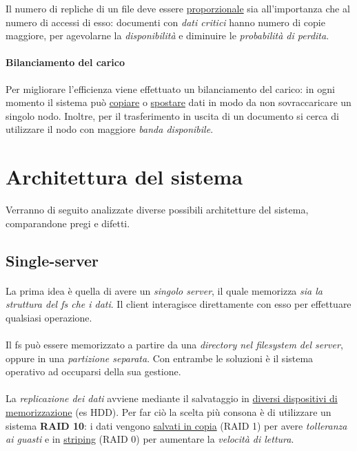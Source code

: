 \documentclass[11pt,a4paper,english]{article}
\begin{document}
Il numero di repliche di un file deve essere \underline{proporzionale} sia all'importanza che al numero di accessi di esso: documenti con \emph{dati critici} hanno numero di copie maggiore, per agevolarne la \emph{disponibilità} e diminuire le \emph{probabilità di perdita}. 


\paragraph{Bilanciamento del carico} Per migliorare l'efficienza viene effettuato un bilanciamento del carico: in ogni momento il sistema può \underline{copiare} o \underline{spostare} dati in modo da non sovraccaricare un singolo nodo. Inoltre, per il trasferimento in uscita di un documento si cerca di utilizzare il nodo con maggiore \emph{banda disponibile}. 



\section{Architettura del sistema}

Verranno di seguito analizzate diverse possibili architetture del sistema, comparandone pregi e difetti. 

\subsection{Single-server}

\paragraph{} La prima idea è quella di avere un \emph{singolo server}, il quale memorizza \emph{sia la struttura del fs che i dati}. Il client interagisce direttamente con esso per effettuare qualsiasi operazione. 

\paragraph{} Il fs può essere memorizzato a partire da una \emph{directory nel filesystem del server}, oppure in una \emph{partizione separata}. Con entrambe le soluzioni è il sistema operativo ad occuparsi della sua gestione.

\paragraph{} La \emph{replicazione dei dati} avviene mediante il salvataggio in \underline{diversi dispositivi di memorizzazione} (es HDD). Per far ciò la scelta più consona è di utilizzare un sistema \textbf{RAID 10}: i dati vengono \underline{salvati in copia} (RAID 1) per avere \emph{tolleranza ai guasti} e in \underline{striping} (RAID 0) per aumentare la \emph{velocità di lettura}. 
\end{document}
